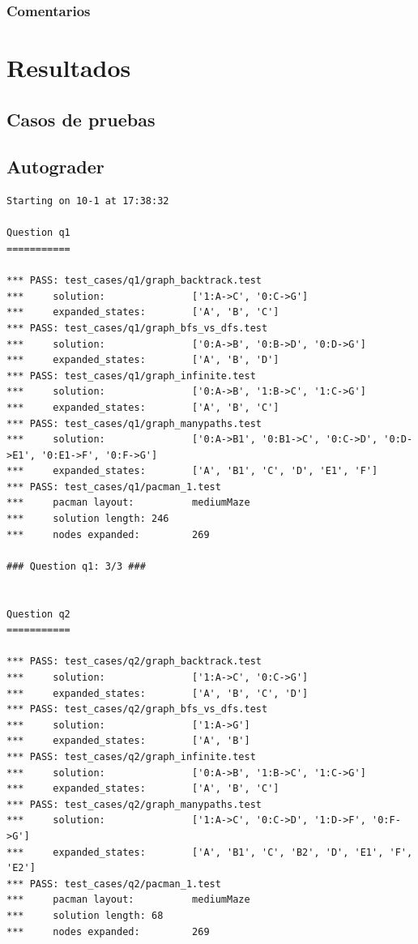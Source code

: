 \documentclass{report}
\begin{document}
        \subsection*{Comentarios}
    \chapter{Resultados}
      \section{Casos de pruebas}
      \section{Autograder}
          \begin{lstlisting}
Starting on 10-1 at 17:38:32

Question q1
===========

*** PASS: test_cases/q1/graph_backtrack.test
***     solution:               ['1:A->C', '0:C->G']
***     expanded_states:        ['A', 'B', 'C']
*** PASS: test_cases/q1/graph_bfs_vs_dfs.test
***     solution:               ['0:A->B', '0:B->D', '0:D->G']
***     expanded_states:        ['A', 'B', 'D']
*** PASS: test_cases/q1/graph_infinite.test
***     solution:               ['0:A->B', '1:B->C', '1:C->G']
***     expanded_states:        ['A', 'B', 'C']
*** PASS: test_cases/q1/graph_manypaths.test
***     solution:               ['0:A->B1', '0:B1->C', '0:C->D', '0:D->E1', '0:E1->F', '0:F->G']
***     expanded_states:        ['A', 'B1', 'C', 'D', 'E1', 'F']
*** PASS: test_cases/q1/pacman_1.test
***     pacman layout:          mediumMaze
***     solution length: 246
***     nodes expanded:         269

### Question q1: 3/3 ###


Question q2
===========

*** PASS: test_cases/q2/graph_backtrack.test
***     solution:               ['1:A->C', '0:C->G']
***     expanded_states:        ['A', 'B', 'C', 'D']
*** PASS: test_cases/q2/graph_bfs_vs_dfs.test
***     solution:               ['1:A->G']
***     expanded_states:        ['A', 'B']
*** PASS: test_cases/q2/graph_infinite.test
***     solution:               ['0:A->B', '1:B->C', '1:C->G']
***     expanded_states:        ['A', 'B', 'C']
*** PASS: test_cases/q2/graph_manypaths.test
***     solution:               ['1:A->C', '0:C->D', '1:D->F', '0:F->G']
***     expanded_states:        ['A', 'B1', 'C', 'B2', 'D', 'E1', 'F', 'E2']
*** PASS: test_cases/q2/pacman_1.test
***     pacman layout:          mediumMaze
***     solution length: 68
***     nodes expanded:         269


\end{lstlisting}
\end{document}
